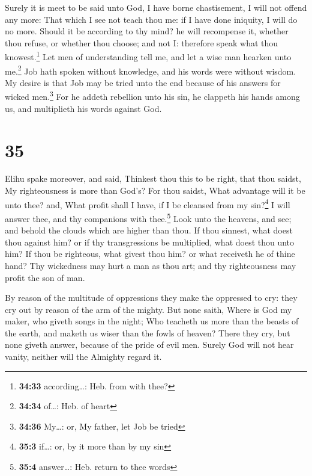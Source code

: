  Surely it is meet to be said unto God, I have borne
chastisement, I will not offend any more:  That which I
see not teach thou me: if I have done iniquity, I will do no more.
 Should it be according to thy mind? he will recompense
it, whether thou refuse, or whether thou choose; and not I: therefore
speak what thou knowest.\footnote{\textbf{34:33} according\ldots: Heb.
  from with thee?}  Let men of understanding tell me, and
let a wise man hearken unto me.\footnote{\textbf{34:34} of\ldots: Heb.
  of heart}  Job hath spoken without knowledge, and his
words were without wisdom.  My desire is that Job may be
tried unto the end because of his answers for wicked men.\footnote{\textbf{34:36}
  My\ldots: or, My father, let Job be tried}  For he
addeth rebellion unto his sin, he clappeth his hands among us, and
multiplieth his words against God.

\hypertarget{section-34}{%
\section{35}\label{section-34}}

 Elihu spake moreover, and said,  Thinkest
thou this to be right, that thou saidst, My righteousness is more than
God's?  For thou saidst, What advantage will it be unto
thee? and, What profit shall I have, if I be cleansed from my
sin?\footnote{\textbf{35:3} if\ldots: or, by it more than by my sin}
 I will answer thee, and thy companions with
thee.\footnote{\textbf{35:4} answer\ldots: Heb. return to thee words}
 Look unto the heavens, and see; and behold the clouds
which are higher than thou.  If thou sinnest, what doest
thou against him? or if thy transgressions be multiplied, what doest
thou unto him?  If thou be righteous, what givest thou
him? or what receiveth he of thine hand?  Thy wickedness
may hurt a man as thou art; and thy righteousness may profit the son of
man.

 By reason of the multitude of oppressions they make the
oppressed to cry: they cry out by reason of the arm of the mighty.
 But none saith, Where is God my maker, who giveth songs
in the night;  Who teacheth us more than the beasts of
the earth, and maketh us wiser than the fowls of heaven? 
There they cry, but none giveth answer, because of the pride of evil
men.  Surely God will not hear vanity, neither will the
Almighty regard it.

